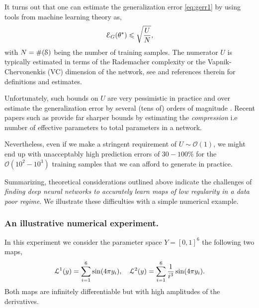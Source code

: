 \documentclass[a4paper]{article}
\numberwithin{equation}{section}
\numberwithin{equation}{section}
\theoremstyle{definition}
\theoremstyle{myremarkstyle}
\renewcommand{\leq}{\leqslant}
\newcommand{\cO}{{\mathcal O}}
\newcommand{\map}{\EuScript{L}}
\newcommand{\train}{\EuScript{S}}
\newcommand{\er}{\EuScript{E}}
\begin{document}
It turns out that one can estimate the generalization error \eqref{eq:gerr1} by using tools from machine learning theory \cite{MLbook} as,
\begin{equation}
\label{eq:gerr2}
\er_{G} (\theta^{\ast}) \leq \sqrt{\frac{U}{N}},
\end{equation}
with $N = \#(\train)$ being the number of training samples. The numerator $U$ is typically estimated in terms of the Rademacher complexity or the Vapnik-Chervonenkis (VC) dimension of the network, see \cite{MLbook} and references therein for definitions and estimates. 


Unfortunately, such bounds on $U$ are very pessimistic in practice and over estimate the generalization error by several (tens of) orders of magnitude \cite{Arora,REC1, NEYS1}. Recent papers such as \cite{Arora} provide far sharper bounds by estimating the \emph{compression} i.e number of effective parameters to total parameters in a network. 

Nevertheless, even if we make a stringent requirement of $U \sim \cO(1)$, we might end up with unacceptably high prediction errors of $30-100 \%$ for the $\cO(10^2-10^3)$ training samples that we can afford to generate in practice. 

Summarizing, theoretical considerations outlined above indicate the challenges of \emph{finding deep neural networks to accurately learn maps of low regularity in a data poor regime}. We illustrate these difficulties with a simple numerical example. 
\subsubsection{An illustrative numerical experiment.}
In this experiment we consider the parameter space $Y = [0,1]^6$ the following two maps, 
\begin{equation}
    \label{eq:sine1}
    \map^1(y) = \sum\limits_{i=1}^6 \sin(4 \pi y_i), \quad 
    \map^2(y) = \sum\limits_{i=1}^6 \frac{1}{i^3} \sin(4 \pi y_i).
\end{equation}
Both maps are infinitely differentiable but with high amplitudes of the derivatives. 
\end{document}
